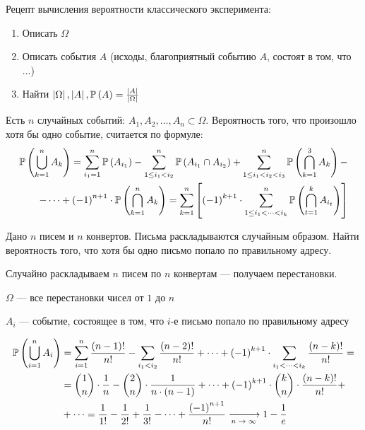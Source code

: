 Рецепт вычисления вероятности классического эксперимента:
\begin{enumerate}
\item Описать $\Omega$
\item Описать события $A$
    (исходы, благоприятный событию $A$, состоят в том, что ...)
\item Найти $\left|\Omega\right|, \left|A\right|, \mathbb{P}\left( A \right)
    =\frac{\left|A\right|}{\left|\Omega\right|}$
\end{enumerate}
\begin{theorem}
Есть $n$ случайных событий: $A_1, A_2, \dots, A_n \subset \Omega$.
Вероятность того, что произошло хотя бы одно событие, считается по формуле:
\begin{align*}
\mathbb{P}\left( \bigcup_{k=1}^n A_k \right)=
\sum_{i_1=1}^n \mathbb{P}\left( A_{i_1} \right) -
\sum_{1\le i_1<i_2}^n \mathbb{P}\left( A_{i_1} \cap A_{i_2} \right)
+ \sum_{1\le i_1<i_2<i_3}^n \mathbb{P}\left( \bigcap_{k=1}^3 A_k \right) -\\
- \dots +
\left(-1\right)^{n+1} \cdot \mathbb{P}\left( \bigcap_{k=1}^n A_k \right) =
 \sum_{k=1}^n
    \left[ \left(-1\right)^{k+1} \cdot
        \sum_{1\le i_1<\dots<i_k}^n \mathbb{P}\left( \bigcap_{t=1}^k A_{i_t} \right)
    \right]
\end{align*}
\end{theorem}

\begin{example}
Дано $n$ писем и $n$ конвертов. Письма раскладываются случайным образом.
Найти вероятность того, что хотя бы одно письмо попало по правильному адресу.

Случайно раскладываем $n$ писем по $n$ конвертам --- получаем перестановки.

$\Omega$ --- все перестановки чисел от $1$ до $n$

$A_i$ --- событие, состоящее в том, что
$i$-е письмо попало по правильному адресу

\begin{align*}
\mathbb{P}\left( \bigcup_{i=1}^n A_i  \right) &=
\sum_{i=1}^n \frac{\left(n-1\right)!}{n!} -
\sum_{i_1<i_2} \frac{\left(n-2\right)!}{n!} + \dots +
\left(-1\right)^{k+1}\cdot
\sum_{i_1<\dots<i_k} \frac{\left(n-k\right)!}{n!}=\\
&=
\binom{1}{n}\cdot\frac{1}{n}-
\binom{2}{n}\cdot\frac{1}{n\cdot\left(n-1\right)}+\dots+
\left(-1\right)^{k+1} \cdot\binom{k}{n}\cdot\frac{\left(n-k\right)!}{n!}+\\
&+\dots =
\frac{1}{1!}-\frac{1}{2!}+\frac{1}{3!}-\dots+
\frac{\left(-1\right)^{n+1}}{n!}
\xrightarrow[\text{$n\to\infty$}]{} 1-\frac{1}{e}
\end{align*}
\end{example}

